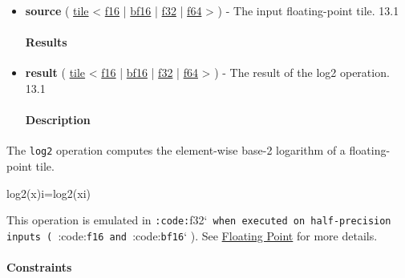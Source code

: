 \documentclass{article}
\begin{document}
\begin{itemize}
\item \textbf{source} ( \href{https://docs.nvidia.com/cuda/tile-ir/latest/sections/types.html#type-tile}{tile} < \href{https://docs.nvidia.com/cuda/tile-ir/latest/sections/types.html#subsection-element-types}{f16} | \href{https://docs.nvidia.com/cuda/tile-ir/latest/sections/types.html#subsection-element-types}{bf16} | \href{https://docs.nvidia.com/cuda/tile-ir/latest/sections/types.html#subsection-element-types}{f32} | \href{https://docs.nvidia.com/cuda/tile-ir/latest/sections/types.html#subsection-element-types}{f64} > ) - The input floating-point tile. 13.1


\paragraph{Results}

\item \textbf{result} ( \href{https://docs.nvidia.com/cuda/tile-ir/latest/sections/types.html#type-tile}{tile} < \href{https://docs.nvidia.com/cuda/tile-ir/latest/sections/types.html#subsection-element-types}{f16} | \href{https://docs.nvidia.com/cuda/tile-ir/latest/sections/types.html#subsection-element-types}{bf16} | \href{https://docs.nvidia.com/cuda/tile-ir/latest/sections/types.html#subsection-element-types}{f32} | \href{https://docs.nvidia.com/cuda/tile-ir/latest/sections/types.html#subsection-element-types}{f64} > ) - The result of the log2 operation. 13.1


\paragraph{Description}

\end{itemize}
The \texttt{log2} operation computes the element-wise base-2 logarithm of a floating-point tile.


log2(x)i=log2(xi)

This operation is emulated in \texttt{:code:}f32`\texttt{ when executed on half-precision inputs ( }:code:\texttt{f16}\texttt{ and }:code:\texttt{bf16}` ). See \href{https://docs.nvidia.com/cuda/tile-ir/latest/sections/operations.html#op-group-floating-point}{Floating Point} for more details.



\paragraph{Constraints}
\end{document}
